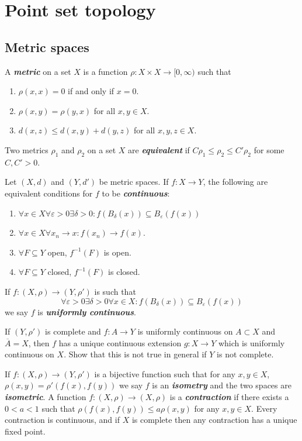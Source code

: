 \documentclass{article}
\theoremstyle{definition}
\numberwithin{equation}{section}
\begin{document}
\clearpage

\section{Point set topology}
	 \subsection{Metric spaces} A \textbf{\textit{metric}} on a set $X$ is a function $\rho:X\times X\to [0,\infty)$ such that
	\begin{enumerate}
		\item $\rho(x,x)=0$ if and only if $x=0$.
		\item $\rho(x,y)=\rho(y,x)$ for all $x,y\in X$.
		\item $d(x,z)\leq d(x,y)+d(y,z)$ for all $x,y,z\in X$.
	\end{enumerate}
	Two metrics $\rho_1$ and $\rho_2$ on a set $X$ are \textbf{\textit{equivalent}} if $C\rho_1\leq\rho_2\leq C'\rho_2$ for some $C,C'>0$.
	
	\begin{thm}Let $(X,d)$ and $(Y,d')$ be metric spaces. If $f:X\to Y$, the following are equivalent conditions for $f$ to be \textbf{\textit{continuous}}:
		\begin{enumerate}
			\item $\forall x\in X\forall\varepsilon>0\exists\delta>0:f(B_\delta(x))\subseteq B_\varepsilon(f(x))$
			\item $\forall x\in X\forall x_n\to x:f(x_n)\to f(x)$.
			\item $\forall F\subseteq Y$ open, $f^{-1}(F)$ is open.
			\item $\forall F\subseteq Y$ closed, $f^{-1}(F)$ is closed.
		\end{enumerate}
	\end{thm}
	If $f:(X,\rho)\to(Y,\rho')$ is such that
	\[\forall\varepsilon>0\exists\delta>0\forall x\in X:f(B_\delta(x))\subseteq B_\varepsilon(f(x))\]
	we say $f$ is \textbf{\textit{uniformly continuous}}.
	\begin{exer*}
		If $(Y,\rho')$ is complete and $f:A\to Y$ is uniformly continuous on $A\subset X$ and $\overline{A}=X$, then $f$ has a unique continuous extension $g:X\to Y$ which is uniformly continuous on $X$. Show that this is not true in general if $Y$ is not complete.
	\end{exer*}
	If $f:(X,\rho)\to(Y,\rho')$ is a bijective function such that for any $x,y\in X$, $\rho(x,y)=\rho'(f(x),f(y))$ we say $f$ is an \textbf{\textit{isometry}} and the two spaces are \textbf{\textit{isometric}}. A function $f:(X,\rho)\to (X,\rho)$ is a \textbf{\textit{contraction}} if there exists a $0<a<1$ such that $\rho(f(x),f(y))\leq a\rho(x,y)$ for any $x,y\in X$. Every contraction is continuous, and if $X$ is complete then any contraction has a unique fixed point.
	
\end{document}

